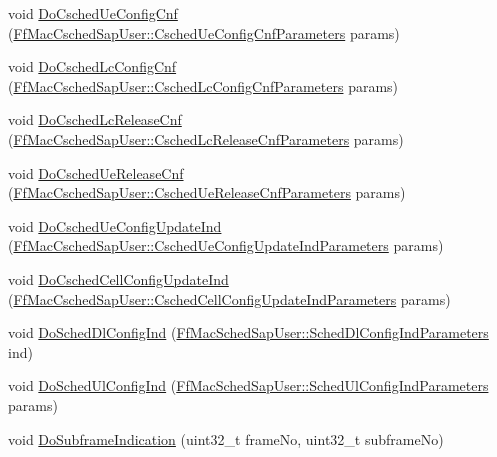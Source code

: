 \begin{DoxyCompactItemize}
\item 
void \hyperlink{classns3_1_1LteEnbMac_a4e966fe49560b93c82e7c9008d463b89}{Do\+Csched\+Ue\+Config\+Cnf} (\hyperlink{structns3_1_1FfMacCschedSapUser_1_1CschedUeConfigCnfParameters}{Ff\+Mac\+Csched\+Sap\+User\+::\+Csched\+Ue\+Config\+Cnf\+Parameters} params)
\item 
void \hyperlink{classns3_1_1LteEnbMac_a4a46e140a354263d5d9ea552abc39faf}{Do\+Csched\+Lc\+Config\+Cnf} (\hyperlink{structns3_1_1FfMacCschedSapUser_1_1CschedLcConfigCnfParameters}{Ff\+Mac\+Csched\+Sap\+User\+::\+Csched\+Lc\+Config\+Cnf\+Parameters} params)
\item 
void \hyperlink{classns3_1_1LteEnbMac_ae3c5164632ee25c81d479f253585094a}{Do\+Csched\+Lc\+Release\+Cnf} (\hyperlink{structns3_1_1FfMacCschedSapUser_1_1CschedLcReleaseCnfParameters}{Ff\+Mac\+Csched\+Sap\+User\+::\+Csched\+Lc\+Release\+Cnf\+Parameters} params)
\item 
void \hyperlink{classns3_1_1LteEnbMac_a31365f062662f74f70f33c48ded23181}{Do\+Csched\+Ue\+Release\+Cnf} (\hyperlink{structns3_1_1FfMacCschedSapUser_1_1CschedUeReleaseCnfParameters}{Ff\+Mac\+Csched\+Sap\+User\+::\+Csched\+Ue\+Release\+Cnf\+Parameters} params)
\item 
void \hyperlink{classns3_1_1LteEnbMac_ab0a026f47edbdc942be527ac21a7344f}{Do\+Csched\+Ue\+Config\+Update\+Ind} (\hyperlink{structns3_1_1FfMacCschedSapUser_1_1CschedUeConfigUpdateIndParameters}{Ff\+Mac\+Csched\+Sap\+User\+::\+Csched\+Ue\+Config\+Update\+Ind\+Parameters} params)
\item 
void \hyperlink{classns3_1_1LteEnbMac_aaf86a0d393f4a5b463ae83e48b42a86b}{Do\+Csched\+Cell\+Config\+Update\+Ind} (\hyperlink{structns3_1_1FfMacCschedSapUser_1_1CschedCellConfigUpdateIndParameters}{Ff\+Mac\+Csched\+Sap\+User\+::\+Csched\+Cell\+Config\+Update\+Ind\+Parameters} params)
\item 
void \hyperlink{classns3_1_1LteEnbMac_a0a3fe07d4ba3040fcb480fd99f24cda8}{Do\+Sched\+Dl\+Config\+Ind} (\hyperlink{structns3_1_1FfMacSchedSapUser_1_1SchedDlConfigIndParameters}{Ff\+Mac\+Sched\+Sap\+User\+::\+Sched\+Dl\+Config\+Ind\+Parameters} ind)
\item 
void \hyperlink{classns3_1_1LteEnbMac_ad67da7ff6449b0297de63c9461ff89e7}{Do\+Sched\+Ul\+Config\+Ind} (\hyperlink{structns3_1_1FfMacSchedSapUser_1_1SchedUlConfigIndParameters}{Ff\+Mac\+Sched\+Sap\+User\+::\+Sched\+Ul\+Config\+Ind\+Parameters} params)
\item 
void \hyperlink{classns3_1_1LteEnbMac_ab26bc2757b329ea602410c1ae039b3be}{Do\+Subframe\+Indication} (uint32\+\_\+t frame\+No, uint32\+\_\+t subframe\+No)

\end{DoxyCompactItemize}
